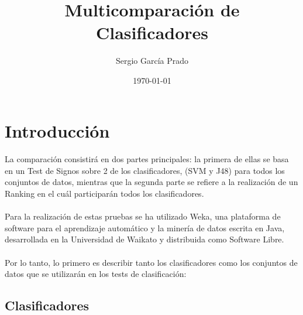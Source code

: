 \documentclass[10pt, a4paper,spanish]{article}
\title{\vspace{-15mm}\fontsize{24pt}{10pt}\selectfont\textbf{Multicomparación de \\ Clasificadores}} %
\author{Sergio García Prado}
\date{\today}
\begin{document}
	\maketitle %

	\thispagestyle{fancy} %


	\begin{abstract}
		\noindent
	\end{abstract}


	\section{Introducción}

        \paragraph{}
		La comparación consistirá en dos partes principales: la primera de ellas se basa en un Test de Signos sobre 2 de los clasificadores, (SVM y J48) para todos los conjuntos de datos, mientras que la segunda parte se refiere a la realización de un Ranking en el cuál participarán todos los clasificadores.

		\paragraph{}
		Para la realización de estas pruebas se ha utilizado Weka, una plataforma de software para el aprendizaje automático y la minería de datos escrita en Java, desarrollada en la Universidad de Waikato y distribuida como Software Libre.

		\paragraph{}
		Por lo tanto, lo primero es describir tanto los clasificadores como los conjuntos de datos que se utilizarán en los tests de clasificación:

		\subsection{Clasificadores}
\end{document}
